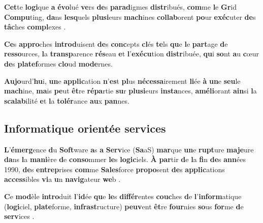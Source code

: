 \documentclass{rapportClass} %
\begin{document}
\textbf{Cet}te \textbf{logi}que \textbf{a} \textbf{évo}lué \textbf{ve}rs \textbf{de}s \textbf{parad}igmes \textbf{distr}ibués, \textbf{com}me \textbf{l}e \textbf{Gr}id
\textbf{Compu}ting, \textbf{da}ns \textbf{lesq}uels \textbf{plusi}eurs \textbf{mach}ines \textbf{collab}orent \textbf{po}ur \textbf{exéc}uter
\textbf{de}s \textbf{tâc}hes \textbf{compl}exes \cite{Foster2001}.

\textbf{Ce}s \textbf{appro}ches \textbf{introd}uisent \textbf{de}s \textbf{conc}epts \textbf{cl}és \textbf{te}ls \textbf{qu}e \textbf{l}e \textbf{part}age \textbf{d}e
\textbf{resso}urces, \textbf{l}a \textbf{transp}arence \textbf{rés}eau \textbf{e}t \textbf{l}’\textbf{exécu}tion \textbf{distr}ibuée, \textbf{qu}i \textbf{so}nt
\textbf{a}u \textbf{c}œur \textbf{de}s \textbf{platef}ormes \textbf{clo}ud \textbf{mode}rnes.

\textbf{Aujo}urd’\textbf{hu}i, \textbf{un}e \textbf{applic}ation \textbf{n}’\textbf{es}t \textbf{pl}us \textbf{nécessa}irement \textbf{li}ée \textbf{à} \textbf{un}e
\textbf{seu}le \textbf{mach}ine, \textbf{ma}is \textbf{pe}ut \textbf{êt}re \textbf{répa}rtie \textbf{su}r \textbf{plusi}eurs \textbf{insta}nces,
\textbf{améli}orant \textbf{ain}si \textbf{l}a \textbf{scalab}ilité \textbf{e}t \textbf{l}a \textbf{tolér}ance \textbf{au}x \textbf{pan}nes.

\subsection{Informatique orientée services}

\textbf{L}’\textbf{émerg}ence \textbf{d}u \textbf{Soft}ware \textbf{a}s \textbf{a} \textbf{Serv}ice (\textbf{Sa}aS) \textbf{mar}que \textbf{un}e \textbf{rupt}ure \textbf{maje}ure
\textbf{da}ns \textbf{l}a \textbf{mani}ère \textbf{d}e \textbf{conso}mmer \textbf{le}s \textbf{logic}iels. \textbf{À} \textbf{par}tir \textbf{d}e \textbf{l}a \textbf{fi}n \textbf{de}s
\textbf{ann}ées 1990, \textbf{de}s \textbf{entrep}rises \textbf{com}me \textbf{Sales}force \textbf{propo}sent \textbf{de}s
\textbf{applic}ations \textbf{access}ibles \textbf{vi}a \textbf{u}n \textbf{navig}ateur \textbf{we}b \cite{Salesforce1999}.

\textbf{C}e \textbf{mod}èle \textbf{intro}duit \textbf{l}’\textbf{id}ée \textbf{qu}e \textbf{le}s \textbf{différ}entes \textbf{couc}hes \textbf{d}e
\textbf{l}’\textbf{inform}atique (\textbf{logi}ciel, \textbf{plate}forme, \textbf{infrast}ructure) \textbf{peuv}ent \textbf{êt}re
\textbf{four}nies \textbf{so}us \textbf{for}me \textbf{d}e \textbf{serv}ices \cite{NIST2026}.
\end{document}
